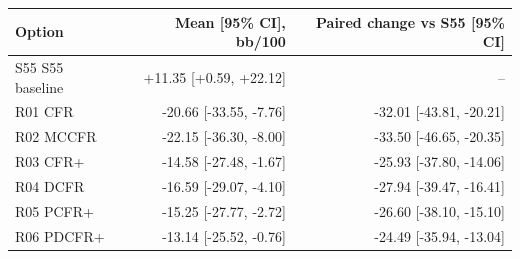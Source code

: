 \begin{tabular}{lrr}
\toprule
Option & Mean [95\% CI], bb/100 & Paired change vs S55 [95\% CI] \\
\midrule
S55 S55 baseline & +11.35 [+0.59, +22.12] & -- \\
R01 CFR & -20.66 [-33.55, -7.76] & -32.01 [-43.81, -20.21] \\
R02 MCCFR & -22.15 [-36.30, -8.00] & -33.50 [-46.65, -20.35] \\
R03 CFR+ & -14.58 [-27.48, -1.67] & -25.93 [-37.80, -14.06] \\
R04 DCFR & -16.59 [-29.07, -4.10] & -27.94 [-39.47, -16.41] \\
R05 PCFR+ & -15.25 [-27.77, -2.72] & -26.60 [-38.10, -15.10] \\
R06 PDCFR+ & -13.14 [-25.52, -0.76] & -24.49 [-35.94, -13.04] \\
\bottomrule
\end{tabular}
